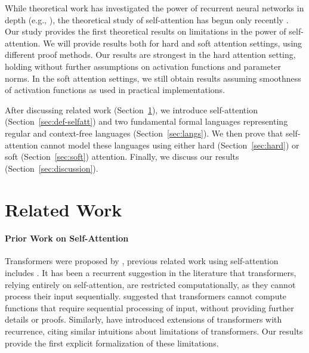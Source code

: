 \documentclass[11pt,a4paper]{article}
\begin{document}
While theoretical work has investigated the power of recurrent neural networks in depth (e.g., \citet{siegelman1991neural, bengio1994learning, weiss2018practical, miller2018recurrent, merrill2019sequential}), the theoretical study of self-attention has begun only recently \citep{perez2019turing,hsieh2019robustness}.
Our study provides the first theoretical results on limitations in the power of self-attention.
We will provide results both for hard and soft attention settings, using different proof methods.
Our results are strongest in the hard attention setting, holding without further assumptions on activation functions and parameter norms.
In the soft attention settings, we still obtain results assuming smoothness of activation functions as used in practical implementations.

After discussing related work (Section~\ref{sec:related}), we introduce self-attention (Section~\ref{sec:def-selfatt}) and two fundamental formal languages representing regular and context-free languages (Section~\ref{sec:langs}).
We then prove that self-attention cannot model these languages using either hard (Section~\ref{sec:hard}) or soft (Section~\ref{sec:soft}) attention.
Finally, we discuss our results (Section~\ref{sec:discussion}).

\section{Related Work}\label{sec:related}
\paragraph{Prior Work on Self-Attention}
Transformers were proposed by \citet{vaswani2017attention}, previous related work using self-attention includes \citet{cheng2016long,parikh2016decomposable,paulus2017deep,lin2017structured}.
It has been a recurrent suggestion in the literature that transformers, relying entirely on self-attention, are restricted computationally, as they cannot process their input sequentially.
\citet{dehghani2018universal} suggested that %
transformers cannot compute functions that require sequential processing of input, without providing further details or proofs.
Similarly, \citet{shen2018disan,chen2018best,hao2019modeling} have introduced extensions of transformers with recurrence, citing similar intuitions about limitations of transformers.
Our results provide the first explicit formalization of these limitations.
\end{document}
